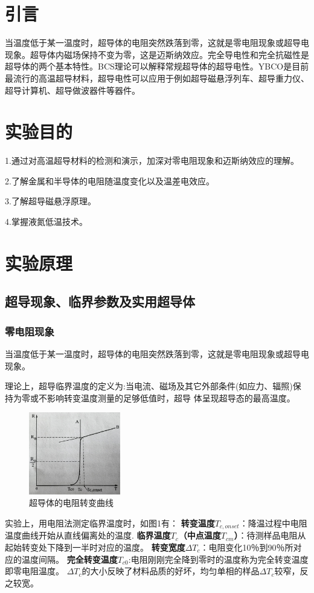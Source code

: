\documentclass[UTF8]{ctexart}
\begin{document}
\begin{multicols}{2}
\section{引言}
当温度低于某一温度时，超导体的电阻突然跌落到零，这就是零电阻现象或超导电现象。超导体内磁场保持不变为零，这是迈斯纳效应。完全导电性和完全抗磁性是超导体的两个基本特性。BCS理论可以解释常规超导体的超导电性。YBCO是目前最流行的高温超导材料，超导电性可以应用于例如超导磁悬浮列车、超导重力仪、超导计算机、超导做波器件等器件。

\section{实验目的}
1.通过对高温超导材料的检测和演示，加深对零电阻现象和迈斯纳效应的理解。

2.了解金属和半导体的电阻随温度变化以及温差电效应。

3.了解超导磁悬浮原理。

4.掌握液氮低温技术。

\section{实验原理}

\subsection{超导现象、临界参数及实用超导体}

\subsubsection{零电阻现象}
当温度低于某一温度时，超导体的电阻突然跌落到零，这就是零电阻现象或超导电现象。

理论上，超导临界温度的定义为:当电流、磁场及其它外部条件(如应力、辐照)保持为零或不影响转变温度测量的足够低值时，超导
体呈现超导态的最高温度。
\begin{figure}[H]
\centering
\includegraphics[width=4cm]{2.jpg}
\caption{\small{超导体的电阻转变曲线}}
\end{figure}
实验上，用电阻法测定临界温度时，如图1有：
\newline\textbf{转变温度$T_{c,onset}$}：降温过程中电阻温度曲线开始从直线偏离处的温度.
\newline\textbf{临界温度$T_c$（中点温度$T_{cm}$）}：待测样品电阻从起始转变处下降到一半时对应的温度。
\newline\textbf{转变宽度$\Delta T_{c}$}：电阻变化10％到90％所对应的温度间隔。
\newline\textbf{完全转变温度$T_{c0}$}:电阻刚刚完全降到零时的温度称为完全转变温度即零电阻温度。
\newline$\Delta T_{c}$的大小反映了材料品质的好坏，均匀单相的样品$\Delta T_{c}$较窄，反之较宽。

\end{multicols}
\end{document}

